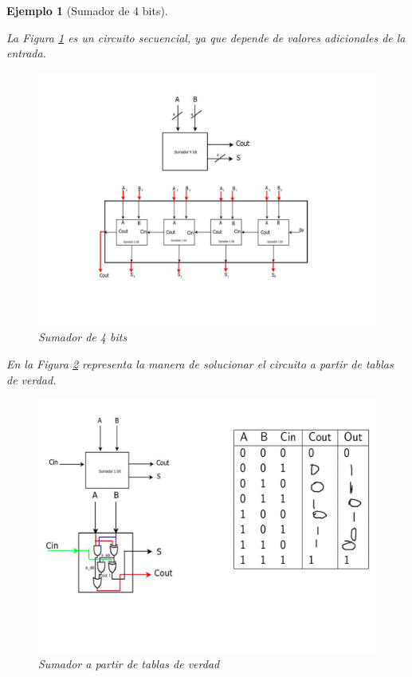 \documentclass[12pt,letterpaper]{book}
\newtheorem{example}{Ejemplo}
\begin{document}
\begin{example}[Sumador de 4 bits]
\begin{multicols}{2}

La Figura \ref{ejeSum1} es un circuito secuencial, ya que depende de valores adicionales de la entrada. 

\begin{figure}[H]
\centering
\includegraphics[width=1\linewidth]{figures/ejeSum1.png}
\caption{Sumador de 4 bits \cite{Beltran}}
\label{ejeSum1}
\end{figure}
\vspace{0.2cm}

En la  Figura \ref{ejeSum2} representa la manera de solucionar el circuito a partir de tablas de verdad.  

\begin{figure}[H]
\centering
\includegraphics[width=1\linewidth]{figures/ejeSum2.png}
\caption{Sumador a partir de tablas de verdad}
\label{ejeSum2}
\end{figure}
\vspace{0.2cm}


\end{multicols}
\end{example}
\end{document}
